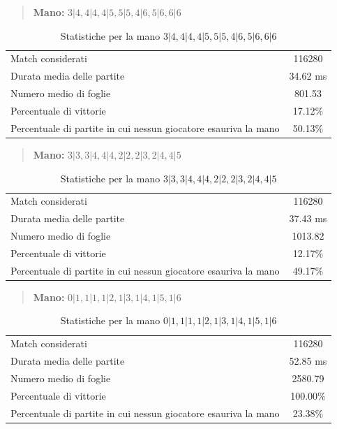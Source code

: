 \documentclass[a4paper,12pt]{report} %
\begin{document}
\begin{quote}
    \textbf{Mano:} \(3|4, 4|4, 4|5, 5|5, 4|6, 5|6, 6|6\)
\end{quote}

\begin{table}[h!]
    \centering
    \begin{tabular}{|l|c|}
        \hline
        Match considerati & 116280 \\
        Durata media delle partite & 34.62 ms \\
        Numero medio di foglie & 801.53 \\
        Percentuale di vittorie & 17.12\% \\
        Percentuale di partite in cui nessun giocatore esauriva la mano & 50.13\% \\
        \hline
    \end{tabular}
    \caption{Statistiche per la mano \(3|4, 4|4, 4|5, 5|5, 4|6, 5|6, 6|6\)}
    \label{tab:stats_1}
\end{table}





\begin{quote}
    \textbf{Mano:} \(3|3, 3|4, 4|4, 2|2, 2|3, 2|4, 4|5\)
\end{quote}

\begin{table}[h!]
    \centering
    \begin{tabular}{|l|c|}
        \hline
        Match considerati & 116280 \\
        Durata media delle partite & 37.43 ms \\
        Numero medio di foglie & 1013.82 \\
        Percentuale di vittorie & 12.17\% \\
        Percentuale di partite in cui nessun giocatore esauriva la mano & 49.17\% \\
        \hline
    \end{tabular}
    \caption{Statistiche per la mano \(3|3, 3|4, 4|4, 2|2, 2|3, 2|4, 4|5\)}
    \label{tab:stats_1}
\end{table}


\begin{quote}
    \textbf{Mano:} \(0|1, 1|1, 1|2, 1|3, 1|4, 1|5, 1|6\)
\end{quote}

\begin{table}[h!]
    \centering
    \begin{tabular}{|l|c|}
        \hline
        Match considerati & 116280 \\
        Durata media delle partite & 52.85 ms \\
        Numero medio di foglie &  2580.79 \\
        Percentuale di vittorie & 100.00\% \\
        Percentuale di partite in cui nessun giocatore esauriva la mano &  23.38\% \\
        \hline
    \end{tabular}
    \caption{Statistiche per la mano \(0|1, 1|1, 1|2, 1|3, 1|4, 1|5, 1|6\)}
    \label{tab:stats_tutti_1}
\end{table}
\end{document}
